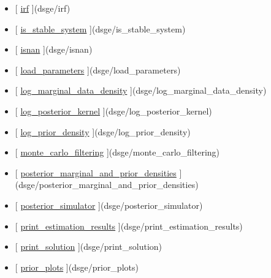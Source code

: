 \documentclass[letterpaper,10pt,english]{sphinxmanual}
\begin{document}
\begin{itemize}
\item {} 
{[} {\hyperref[classes/models/@dsge/dsge:irf]{irf}} {]}(dsge/irf)

\item {} 
{[} {\hyperref[classes/models/@dsge/dsge:is-stable-system]{is\_stable\_system}} {]}(dsge/is\_stable\_system)

\item {} 
{[} {\hyperref[classes/models/@dsge/dsge:isnan]{isnan}} {]}(dsge/isnan)

\item {} 
{[} {\hyperref[classes/models/@dsge/dsge:load-parameters]{load\_parameters}} {]}(dsge/load\_parameters)

\item {} 
{[} {\hyperref[classes/models/@dsge/dsge:log-marginal-data-density]{log\_marginal\_data\_density}} {]}(dsge/log\_marginal\_data\_density)

\item {} 
{[} {\hyperref[classes/models/@dsge/dsge:log-posterior-kernel]{log\_posterior\_kernel}} {]}(dsge/log\_posterior\_kernel)

\item {} 
{[} {\hyperref[classes/models/@dsge/dsge:log-prior-density]{log\_prior\_density}} {]}(dsge/log\_prior\_density)

\item {} 
{[} {\hyperref[classes/models/@dsge/dsge:monte-carlo-filtering]{monte\_carlo\_filtering}} {]}(dsge/monte\_carlo\_filtering)

\item {} 
{[} {\hyperref[classes/models/@dsge/dsge:posterior-marginal-and-prior-densities]{posterior\_marginal\_and\_prior\_densities}} {]}(dsge/posterior\_marginal\_and\_prior\_densities)

\item {} 
{[} {\hyperref[classes/models/@dsge/dsge:posterior-simulator]{posterior\_simulator}} {]}(dsge/posterior\_simulator)

\item {} 
{[} {\hyperref[classes/models/@dsge/dsge:print-estimation-results]{print\_estimation\_results}} {]}(dsge/print\_estimation\_results)

\item {} 
{[} {\hyperref[classes/models/@dsge/dsge:print-solution]{print\_solution}} {]}(dsge/print\_solution)

\item {} 
{[} {\hyperref[classes/models/@dsge/dsge:prior-plots]{prior\_plots}} {]}(dsge/prior\_plots)


\end{itemize}
\end{document}
